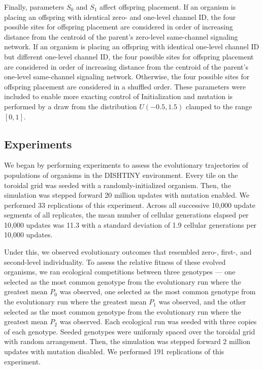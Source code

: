 Finally, parameters $S_0$ and $S_1$ affect offspring placement.
If an organism is placing an offspring with identical zero- and one-level channel ID, the four possible sites for offspring placement are considered in order of increasing distance from the centroid of the parent's zero-level same-channel signaling network.
If an organism is placing an offspring with identical one-level channel ID but different one-level channel ID, the four possible sites for offspring placement are considered in order of increasing distance from the centroid of the parent's one-level same-channel signaling network.
Otherwise, the four possible sites for offspring placement are considered in a shuffled order.
These parameters were included to enable more exacting control of
Initialization and mutation is performed by a draw from the distribution $U(-0.5,1.5)$ clamped to the range $[0,1]$.

\subsection{Experiments}

We began by performing experiments to assess the evolutionary trajectories of populations of organisms in the DISHTINY environment.
Every tile on the toroidal grid was seeded with a randomly-initialized organism.
Then, the simulation was stepped forward 20 million updates with mutation enabled.
We performed 33 replications of this experiment.
Across all successive 10,000 update segments of all replicates, the mean number of cellular generations elapsed per 10,000 updates was 11.3 with a standard deviation of 1.9 cellular generations per 10,000 updates.

Under this, we observed evolutionary outcomes that resembled zero-, first-, and second-level individuality.
To assess the relative fitness of these evolved organisms, we ran ecological competitions between three genotypes --- one selected as the most common genotype from the evolutionary run where the greatest mean $P_0$ was observed, one selected as the most common genotype from the evolutionary run where the greatest mean $P_1$ was observed, and the other selected as the most common genotype from the evolutionary run where the greatest mean $P_2$ was observed.
Each ecological run was seeded with three copies of each genotype.
Seeded genotypes were uniformly spaced over the toroidal grid with random arrangement.
Then, the simulation was stepped forward 2 million updates with mutation disabled.
We performed 191 replications of this experiment.

